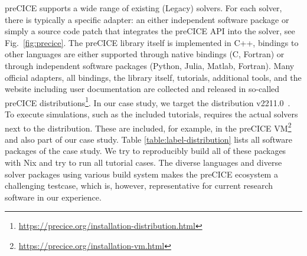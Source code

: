 \documentclass{eceasst}
\begin{document}
preCICE supports a wide range of existing (Legacy) solvers. For each solver, there is typically a specific adapter: an either independent software package or simply a source code patch that integrates the preCICE API into the solver, see Fig.~\ref{fig:precice}.
The preCICE library itself is implemented in C++, bindings to other languages are either supported through native bindings (C, Fortran) or through independent software packages (Python, Julia, Matlab, Fortran).
Many official adapters, all bindings, the library itself, tutorials, additional tools, and the website including user documentation are collected and released in so-called preCICE distributions\footnote{\url{https://precice.org/installation-distribution.html}}.
In our case study, we target the distribution v2211.0~\cite{preciceDistribution}. To execute simulations, such as the included tutorials, requires the actual solvers next to the distribution. These are included, for example, in the preCICE VM\footnote{\url{https://precice.org/installation-vm.html}} and also part of our case study. Table \ref{table:label-distribution} lists all software packages of the case study. We try to reproducibly build all of these packages with Nix and try to run all tutorial cases. 
The diverse languages and diverse solver packages using various build system makes the preCICE ecosystem a challenging testcase, which is, however, representative for current research software in our experience. 
\end{document}
